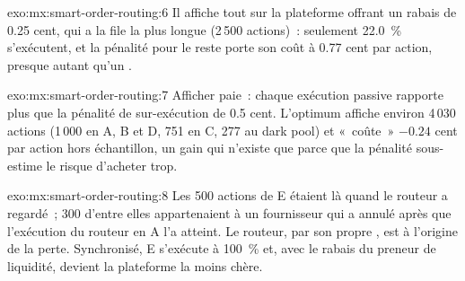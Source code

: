 \begin{solution}{exo:mx:smart-order-routing:6}
Il affiche tout sur la plateforme offrant un rabais de 0.25 cent, qui a la file la plus longue (2\,500 actions)~: seulement 22.0~\% s'exécutent, et la pénalité pour le
reste porte son coût à 0.77 cent par action, presque autant qu'un .
\end{solution}

\begin{solution}{exo:mx:smart-order-routing:7}
Afficher paie~: chaque exécution passive rapporte plus que la pénalité de sur-exécution de 0.5 cent. L'optimum affiche environ 4\,030 actions (1\,000 en A, B et D, 751 en C,
277 au dark pool) et «~coûte~» $-0.24$ cent par action hors échantillon, un gain qui n'existe que parce que la pénalité sous-estime le risque d'acheter
trop.
\end{solution}

\begin{solution}{exo:mx:smart-order-routing:8}
Les 500 actions de E étaient là quand le routeur a regardé~; 300 d'entre elles appartenaient à un fournisseur qui a annulé après que l'exécution du routeur en A l'a atteint.
Le routeur, par son propre , est à l'origine de la perte. Synchronisé, E s'exécute à 100~\% et, avec le rabais du preneur de liquidité, devient la plateforme la moins chère.
\end{solution}


